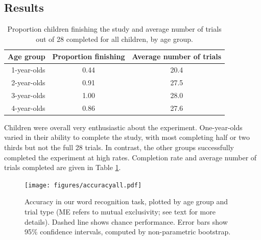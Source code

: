 \documentclass[man,noapacite]{apa2}
\begin{document}
\subsection{Results}


\begin{table}[t]
\centering
\caption{Proportion children finishing the study and average number of trials out of 28 completed for all children, by age group.\label{tab:completion}}

\begin{tabular}{rcc}
  \hline
Age group & Proportion finishing & Average number of trials \\ 
  \hline
1-year-olds & 0.44 & 20.4 \\ 
2-year-olds & 0.91 & 27.5 \\ 
3-year-olds & 1.00 & 28.0 \\ 
4-year-olds & 0.86 & 27.6 \\ 
   \hline
\end{tabular}
\end{table}

Children were overall very enthusiastic about the experiment. One-year-olds varied in their ability to complete the study, with most completing half or two thirds but not the full 28 trials. In contrast, the other groups successfully completed the experiment at high rates. Completion rate and average number of trials completed are given in Table \ref{tab:completion}.

\begin{figure}[t] 
  \begin{center} 
    \texttt{[image: figures/accuracyall.pdf]} 
    \caption{\label{fig:accuracy} Accuracy in our word recognition task, plotted by age group and trial type (ME refers to mutual exclusivity; see text for more details). Dashed line shows chance performance. Error bars show 95\% confidence intervals, computed by non-parametric bootstrap. }
  \end{center} 
\end{figure}
\end{document}
